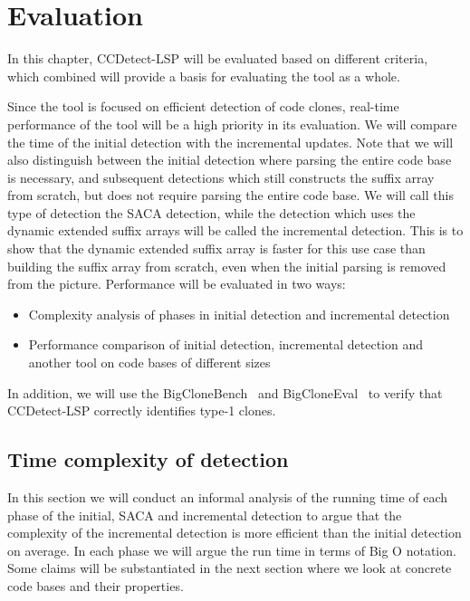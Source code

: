 \chapter{Evaluation}
\label{evaluation}

In this chapter, CCDetect-LSP will be evaluated based on different criteria, which combined
will provide a basis for evaluating the tool as a whole.

Since the tool is focused on efficient detection of code clones, real-time performance of
the tool will be a high priority in its evaluation. We will compare the time of the
initial detection with the incremental updates. Note that we will also distinguish between
the initial detection where parsing the entire code base is necessary, and subsequent
detections which still constructs the suffix array from scratch, but does not require
parsing the entire code base. We will call this type of detection the SACA detection,
while the detection which uses the dynamic extended suffix arrays will be called the
incremental detection. This is to show that the dynamic extended suffix array is faster
for this use case than building the suffix array from scratch, even when the initial
parsing is removed from the picture. Performance will be evaluated in two ways:

\begin{itemize}
    \item Complexity analysis of phases in initial detection and incremental detection
    \item Performance comparison of initial detection, incremental detection and another
        tool on code bases of different sizes
\end{itemize}

In addition, we will use the BigCloneBench~\cite{BigCloneBench} and
BigCloneEval~\cite{BigCloneEval} to verify that CCDetect-LSP correctly identifies type-1
clones.

\section{Time complexity of detection}

In this section we will conduct an informal analysis of the running time of each phase of
the initial, SACA and incremental detection to argue that the complexity of the
incremental detection is more efficient than the initial detection on average. In each
phase we will argue the run time in terms of Big O notation. Some claims will be
substantiated in the next section where we look at concrete code bases and their
properties.

